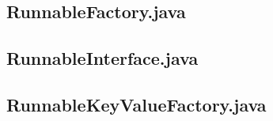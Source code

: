\subsection{RunnableFactory.java}

\clearpage

\subsection{RunnableInterface.java}

\clearpage

\subsection{RunnableKeyValueFactory.java}

\clearpage
